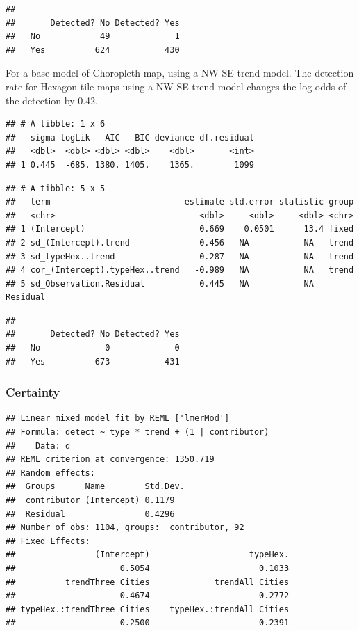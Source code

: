\documentclass[conference,final,]{IEEEtran}
\begin{document}
\begin{verbatim}
##      
##       Detected? No Detected? Yes
##   No            49             1
##   Yes          624           430
\end{verbatim}

For a base model of Choropleth map, using a NW-SE trend model. The
detection rate for Hexagon tile maps using a NW-SE trend model changes
the log odds of the detection by 0.42.

\begin{verbatim}
## # A tibble: 1 x 6
##   sigma logLik   AIC   BIC deviance df.residual
##   <dbl>  <dbl> <dbl> <dbl>    <dbl>       <int>
## 1 0.445  -685. 1380. 1405.    1365.        1099
\end{verbatim}

\begin{verbatim}
## # A tibble: 5 x 5
##   term                           estimate std.error statistic group   
##   <chr>                             <dbl>     <dbl>     <dbl> <chr>   
## 1 (Intercept)                       0.669    0.0501      13.4 fixed   
## 2 sd_(Intercept).trend              0.456   NA           NA   trend   
## 3 sd_typeHex..trend                 0.287   NA           NA   trend   
## 4 cor_(Intercept).typeHex..trend   -0.989   NA           NA   trend   
## 5 sd_Observation.Residual           0.445   NA           NA   Residual
\end{verbatim}

\begin{verbatim}
##      
##       Detected? No Detected? Yes
##   No             0             0
##   Yes          673           431
\end{verbatim}

\hypertarget{certainty-1}{%
\subsubsection{Certainty}\label{certainty-1}}

\begin{verbatim}
## Linear mixed model fit by REML ['lmerMod']
## Formula: detect ~ type * trend + (1 | contributor)
##    Data: d
## REML criterion at convergence: 1350.719
## Random effects:
##  Groups      Name        Std.Dev.
##  contributor (Intercept) 0.1179  
##  Residual                0.4296  
## Number of obs: 1104, groups:  contributor, 92
## Fixed Effects:
##                (Intercept)                    typeHex.  
##                     0.5054                      0.1033  
##          trendThree Cities             trendAll Cities  
##                    -0.4674                     -0.2772  
## typeHex.:trendThree Cities    typeHex.:trendAll Cities  
##                     0.2500                      0.2391
\end{verbatim}
\end{document}
